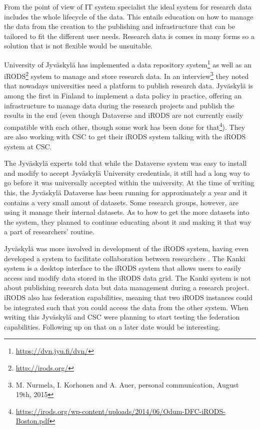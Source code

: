 From the point of view of IT system specialist the ideal system for research
data includes the whole lifecycle of the data. This entails education on how
to manage the data from the creation to the publishing and infrastructure that
can be tailored to fit the different user needs. Research data is comes in
many forms so a solution that is not flexible would be unsuitable.

University of Jyväskylä has implemented a data repository system\footnote{\url{https://dvn.jyu.fi/dvn/}}
as well as an iRODS\footnote{\url{http://irods.org/}} system to manage and
store research data. In an interview\footnote{M. Nurmela, I. Korhonen and A.
Auer, personal communication, August 19th, 2015} they noted that nowadays
universities need a platform to publish research data. Jyväskylä is among the
first in Finland to implement a data policy in practice, offering an
infrastructure to manage data during the research projects and publish the
results in the end (even though Dataverse and iRODS are not currently
easily compatible with each other, though some work has been done for
that\footnote{\url{https://irods.org/wp-content/uploads/2014/06/Odum-DFC-iRODS-Boston.pdf}}).
They are also working with CSC to get their iRODS system talking with the iRODS
system at CSC.

The Jyväskylä experts told that while the Dataverse system was easy to install
and modify to accept Jyväskylä University credentials, it still had a long way to go
before it was universally accepted within the university. At the time of
writing this, the Jyväskylä Dataverse has been running for approximately a
year and it contains a very small amout of datasets. Some research groups,
however, are using it manage their internal datasets. As to how to get the
more datasets into the system, they planned to continue educating about it
and making it that way a part of researchers' routine.

Jyväskylä was more involved in development of the iRODS system, having even
developed a system to facilitate collaboration between researchers
\cite{irodsinproceedings}. The Kanki system is a desktop interface to the iRODS
system that allows users to easily access and modify data stored in the iRODS
data grid. The Kanki system is not about publishing research data but data
management during a research project. iRODS also has federation capabilities,
meaning that two iRODS instances could be integrated such that you could
access the data from the other system. When writing this Jyväskylä and CSC
were planning to start testing the federation capabilities. Following up on that
on a later date would be interesting.


